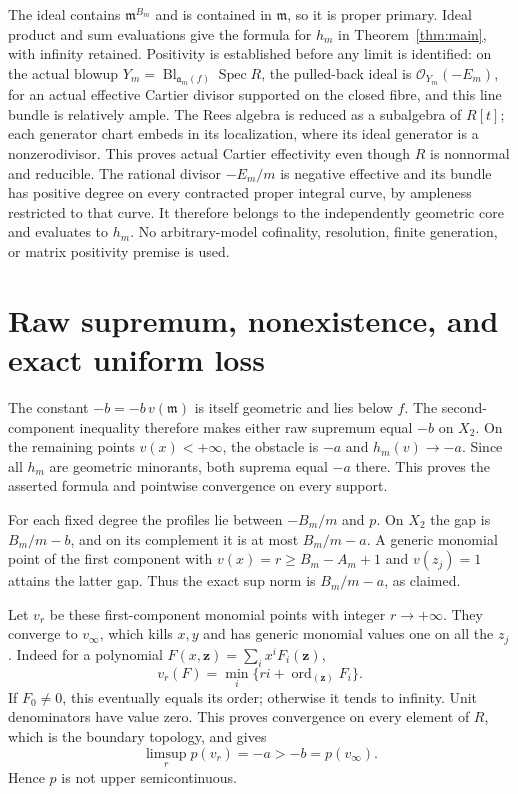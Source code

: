 \documentclass[11pt]{article}
\newcommand{\m}{\mathfrak m}
\newcommand{\ord}{\operatorname{ord}}
\newcommand{\Spec}{\operatorname{Spec}}
\begin{document}
The ideal contains \(\m^{B_m}\) and is contained in \(\m\),
so it is proper primary. Ideal product and sum evaluations give the
formula for \(h_m\) in Theorem~\ref{thm:main}, with infinity retained.
Positivity is established before any limit is identified: on the actual
blowup \(Y_m=\operatorname{Bl}_{\mathfrak a_m(f)}\Spec R\), the pulled-back
ideal is \(\mathcal O_{Y_m}(-E_m)\), for an actual effective Cartier
divisor supported on the closed fibre, and this line bundle is relatively
ample. The Rees algebra is reduced as a subalgebra of \(R[t]\);
each generator chart embeds in its localization, where its ideal
generator is a nonzerodivisor. This proves actual Cartier effectivity
even though \(R\) is nonnormal and reducible.
The rational divisor \(-E_m/m\) is negative effective and its bundle
has positive degree on every contracted proper integral curve, by
ampleness restricted to that curve. It therefore belongs to the independently
geometric core and evaluates to \(h_m\). No arbitrary-model cofinality,
resolution, finite generation, or matrix positivity premise is used.

\section{Raw supremum, nonexistence, and exact uniform loss}

The constant \(-b=-b\,v(\m)\) is itself geometric and lies below \(f\).
The second-component inequality therefore makes either raw supremum
equal \(-b\) on \(X_2\).
On the remaining points \(v(x)<+\infty\), the obstacle is \(-a\)
and \(h_m(v)\to-a\). Since all \(h_m\) are geometric minorants,
both suprema equal \(-a\) there. This proves the asserted formula
and pointwise convergence on every support.

For each fixed degree the profiles lie between \(-B_m/m\) and \(p\).
On \(X_2\) the gap is \(B_m/m-b\), and on its complement it is
at most \(B_m/m-a\). A generic monomial point of the first component
with \(v(x)=r\geq B_m-A_m+1\) and \(v(z_j)=1\) attains the latter
gap. Thus the exact sup norm is \(B_m/m-a\), as claimed.

Let \(v_r\) be these first-component monomial points with integer
\(r\to+\infty\). They converge to \(v_\infty\), which kills
\(x,y\) and has generic monomial values one on all the \(z_j\).
Indeed for a polynomial \(F(x,\mathbf z)=\sum_i x^iF_i(\mathbf z)\),
\[
 v_r(F)=\min_i\{ri+\ord_{(\mathbf z)}F_i\}.
\]
If \(F_0\neq0\), this eventually equals its order; otherwise it tends
to infinity. Unit denominators have value zero. This proves convergence
on every element of \(R\), which is the boundary topology, and gives
\[
 \limsup_r p(v_r)=-a>-b=p(v_\infty).
\]
Hence \(p\) is not upper semicontinuous.
\end{document}
